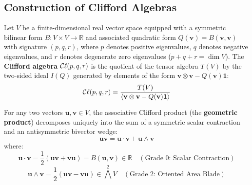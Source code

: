 \subsection{Construction of Clifford Algebras}
\begin{definition}
Let $V$ be a finite-dimensional real vector space equipped with a symmetric bilinear form $B: V \times V \to \mathbb{R}$ and associated quadratic form $Q(\mathbf{v}) = B(\mathbf{v}, \mathbf{v})$ with signature $(p, q, r)$, where $p$ denotes positive eigenvalues, $q$ denotes negative eigenvalues, and $r$ denotes degenerate zero eigenvalues ($p+q+r = \dim V$). The \textbf{Clifford algebra} $\mathcal{C}\ell(p,q,r)$ is the quotient of the tensor algebra $T(V)$ by the two-sided ideal $I(Q)$ generated by elements of the form $\mathbf{v} \otimes \mathbf{v} - Q(\mathbf{v}) \mathbf{1}$:
\begin{equation}
    \mathcal{C}\ell(p,q,r) = \frac{T(V)}{\langle \mathbf{v} \otimes \mathbf{v} - Q(\mathbf{v}) \mathbf{1} \rangle}
\end{equation}
\end{definition}

\begin{definition}
For any two vectors $\mathbf{u}, \mathbf{v} \in V$, the associative Clifford product (the \textbf{geometric product}) decomposes uniquely into the sum of a symmetric scalar contraction and an antisymmetric bivector wedge:
\begin{equation}
    \mathbf{u}\mathbf{v} = \mathbf{u} \cdot \mathbf{v} + \mathbf{u} \wedge \mathbf{v}
\end{equation}
where:
\begin{equation}
    \mathbf{u} \cdot \mathbf{v} = \frac{1}{2}(\mathbf{u}\mathbf{v} + \mathbf{v}\mathbf{u}) = B(\mathbf{u}, \mathbf{v}) \in \mathbb{R} \quad (\text{Grade 0: Scalar Contraction})
\end{equation}
\begin{equation}
    \mathbf{u} \wedge \mathbf{v} = \frac{1}{2}(\mathbf{u}\mathbf{v} - \mathbf{v}\mathbf{u}) \in \bigwedge^2 V \quad (\text{Grade 2: Oriented Area Blade})
\end{equation}
\end{definition}

